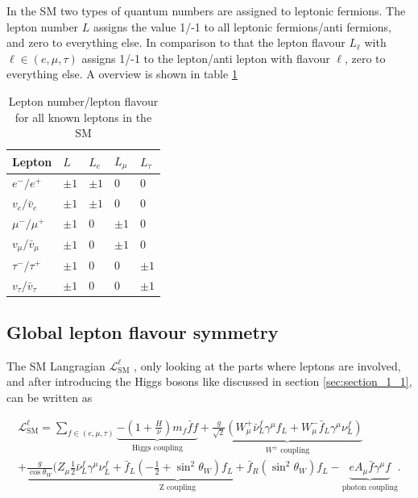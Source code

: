 In the \gls{SM} two types of quantum numbers are assigned to leptonic fermions. The lepton number $L$ assigns the value 1/-1 to all leptonic fermions/anti fermions, and zero to everything else. In comparison to that the lepton flavour $L_{\ell}$ with $\ell \in (e, \mu, \tau)$ assigns 1/-1 to the lepton/anti lepton with flavour $\ell$, zero to everything else. A overview is shown in table \ref{tab:tab_1_2}


\begin{table}[h]
	\centering
	\caption[Lepton number/lepton flavour of leptons]{Lepton number/lepton flavour for all known leptons in the \gls{SM}}
	\label{tab:tab_1_2}

	\begin{tabular}{l|l|l|l|l}
		Lepton				&$L$		&$L_{e}$	&$L_{\mu}$	&$L_{\tau}$	\\ \hline
		
		$e^{-}/e^{+}$			&$\pm 1$	&$\pm 1$	&0		&0		\\

		$v_{e}/\bar{v}_{e}$		&$\pm 1$	&$\pm 1$	&0		&0		\\
		
		$\mu^{-}/\mu^{+}$		&$\pm 1$	&0		&$\pm 1$	&0		\\

		$v_{\mu}/\bar{v}_{\mu}$		&$\pm 1$	&0		&$\pm 1$	&0		\\
		
		$\tau^{-}/\tau^{+}$		&$\pm 1$	&0		&0		&$\pm 1$	\\

		$v_{\tau}/\bar{v}_{\tau}$	&$\pm 1$	&0		&0		&$\pm 1$	\\			
	\end{tabular}
\end{table}


\subsection{Global lepton flavour symmetry}
\label{sec:section_1_3_1}

The \gls{SM} Langragian $\mathcal{L}^{\ell}_{\text{SM}}$ \cite{Peskin, EWK}, only looking at the parts where leptons are involved, and after introducing the Higgs bosons like discussed in section \ref{sec:section_1_1}, can be written as

\begin{multline}
	\label{eq:eq_1_12}
	\mathcal{L}^{\ell}_{\text{SM}} = \sum_{f \in (e, \mu, \tau)} \underbrace{-(1+\frac{H}{\nu}) m_{f} \bar{f}f}_\text{Higgs coupling} + \underbrace{\frac{g}{\sqrt{2}} (W^{+}_{\mu} \bar{\nu}^{f}_{L} \gamma^{\mu} f_{L} + W^{-}_{\mu} \bar{f}_{L} \gamma^{\mu} \nu^{f}_{L})}_{W^{\pm} \text{ coupling}} \\
	+ \underbrace{\frac{g}{\cos{\theta_{W}}}(Z_{\mu} \frac{1}{2} \bar{\nu}^{f}_{L} \gamma^{\mu}\nu^{f}_{L} + \bar{f}_{L}(-\frac{1}{2} + \sin^2{\theta_{W}})f_{L} + \bar{f}_{R}(\sin^2{\theta_{W}})f_{L}}_{\text{Z coupling}} - \underbrace{eA_{\mu}\bar{f}\gamma^{\mu}f}_{\text{photon coupling}}.
\end{multline}

